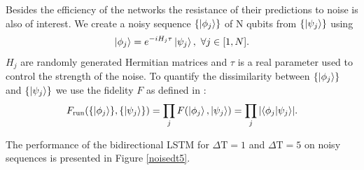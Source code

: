 Besides the efficiency of the networks the resistance of their predictions to noise is also of interest.
We create a noisy sequence $\{\ket{\phi_j}\}$ of N qubits from $\{\ket{\psi_j}\}$ using
\begin{align*}
	\ket{\phi_j} = e^{-i H_j \tau} \ket{\psi_j}, \ \forall j \in [1, N].
\end{align*}
$H_j$ are randomly generated Hermitian matrices and $\tau$ is a real parameter used to control the strength of the noise.
To quantify the dissimilarity between $\{\ket{\phi_j}\}$ and $\{\ket{\psi_j}\}$ we use the fidelity $F$ as defined in \cite{10.5555/1972505}:
\begin{align*}
	F_{\text{run}}(\{\ket{\phi_j}\}, \{\ket{\psi_j}\}) = \prod_j F(\ket{\phi_j}, \ket{\psi_j}) = \prod_j \abs{\bra{\phi_j}\ket{\psi_j}}.
\end{align*}

The performance of the bidirectional LSTM for $\Delta \mathrm{T} = 1$ and $\Delta \mathrm{T} = 5$ on noisy sequences is presented in Figure \ref{noisedt5}.


